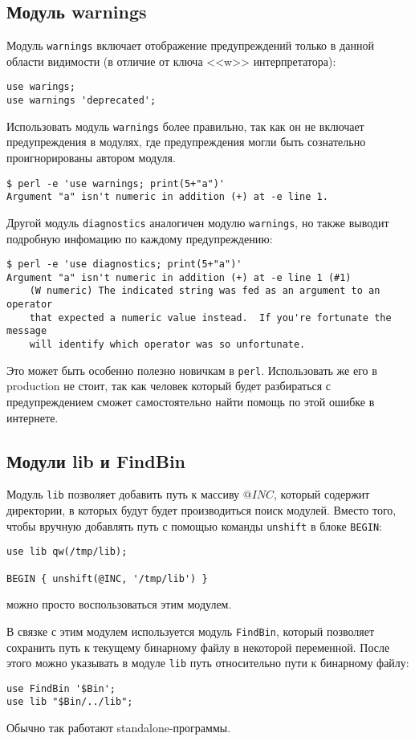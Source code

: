 \subsection{Модуль warnings} %
Модуль \verb|warnings| включает отображение предупреждений только в данной области видимости (в отличие от ключа <<w>> интерпретатора):
\begin{verbatim}
use warings;
use warnings 'deprecated';
\end{verbatim}
Использовать модуль \verb|warnings| более правильно, так как он не включает предупреждения в модулях, где предупреждения могли быть сознательно проигнорированы автором модуля.
\begin{verbatim}
$ perl -e 'use warnings; print(5+"a")'
Argument "a" isn't numeric in addition (+) at -e line 1.
\end{verbatim}

Другой модуль \verb|diagnostics| аналогичен модулю \verb|warnings|, но также выводит подробную инфомацию по каждому предупреждению:
\begin{verbatim}
$ perl -e 'use diagnostics; print(5+"a")'
Argument "a" isn't numeric in addition (+) at -e line 1 (#1)
    (W numeric) The indicated string was fed as an argument to an operator
    that expected a numeric value instead.  If you're fortunate the message
    will identify which operator was so unfortunate.
\end{verbatim}
Это может быть особенно полезно новичкам в \verb|perl|. Использовать же его в production не стоит, так как человек который будет разбираться с предупреждением сможет самостоятельно найти помощь по этой ошибке в интернете.

\subsection{Модули lib и FindBin} %
Модуль \verb|lib| позволяет добавить путь к массиву $@INC$, который содержит директории, в которых будут будет производиться поиск модулей. Вместо того, чтобы вручную добавлять путь с помощью команды \verb|unshift| в блоке \verb|BEGIN|:
\begin{verbatim}
use lib qw(/tmp/lib);

BEGIN { unshift(@INC, '/tmp/lib') }
\end{verbatim}
можно просто воспользоваться этим модулем.

В связке с этим модулем используется модуль \verb|FindBin|, который позволяет сохранить путь к текущему бинарному файлу в некоторой переменной. После этого можно указывать в модуле \verb|lib| путь относительно пути к бинарному файлу:
\begin{verbatim}
use FindBin '$Bin';
use lib "$Bin/../lib";
\end{verbatim}
Обычно так работают standalone-программы.

